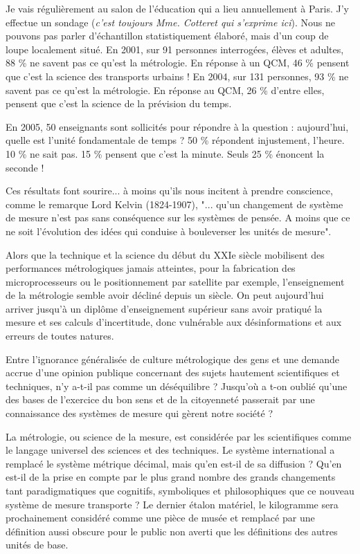 \documentclass[main.tex]{subfiles}
\begin{document}
Je vais régulièrement au salon de l'éducation qui a lieu annuellement à Paris. J'y effectue un sondage (\textit{c'est toujours Mme. Cotteret qui s'exprime ici}). Nous ne pouvons pas parler d'échantillon statistiquement élaboré, mais d'un coup de loupe localement situé.  En 2001, sur 91 personnes interrogées, élèves et adultes, 88 \% ne savent pas ce qu'est la métrologie.  En réponse à un QCM, 46 \% pensent que c'est la science des transports urbains ! En 2004, sur 131 personnes, 93 \% ne savent pas ce qu'est la métrologie. En réponse au QCM, 26 \% d'entre elles, pensent que c'est la science de la prévision du temps.

En 2005, 50 enseignants sont sollicités pour répondre à la question : aujourd'hui, quelle est l'unité fondamentale de temps ?   50 \% répondent injustement, l'heure.  10 \% ne sait pas.  15 \% pensent que c'est la minute.  Seuls 25 \% énoncent la seconde !

Ces résultats font sourire... à moins qu'ils nous incitent à prendre conscience, comme le remarque Lord Kelvin (1824-1907), "... qu'un changement de système de mesure n'est pas sans conséquence sur les systèmes de pensée. A moins que ce ne soit l'évolution des idées qui conduise à bouleverser les unités de mesure".
 
Alors que la technique et la science du début du XXIe siècle mobilisent des performances métrologiques jamais atteintes, pour la fabrication des microprocesseurs ou le positionnement par satellite par exemple, l'enseignement de la métrologie semble avoir décliné depuis un siècle. On peut aujourd'hui arriver jusqu'à un diplôme d'enseignement supérieur sans avoir pratiqué la mesure et ses calculs d'incertitude, donc vulnérable aux désinformations et aux erreurs de toutes natures.

Entre l'ignorance généralisée de culture métrologique des gens et une demande accrue d'une opinion publique concernant des sujets hautement scientifiques et techniques, n'y a-t-il pas comme un déséquilibre ? Jusqu'où a t-on oublié qu'une des bases de l'exercice du bon sens et de la citoyenneté passerait par une connaissance des systèmes de mesure qui gèrent notre société ?

La métrologie, ou science de la mesure, est considérée par les scientifiques comme le langage universel des sciences et des techniques.  Le système international a remplacé le système métrique décimal, mais qu'en est-il de sa diffusion ?  Qu'en est-il de la prise en compte par le plus grand nombre des grands changements tant paradigmatiques que cognitifs, symboliques et philosophiques que ce nouveau système de mesure transporte ?  Le dernier étalon matériel, le kilogramme sera prochainement considéré comme une pièce de musée et remplacé par une définition aussi obscure pour le public non averti que les définitions des autres unités de base.
\end{document}
